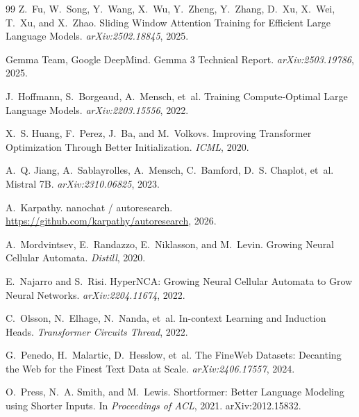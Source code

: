 \documentclass[11pt,a4paper]{article}
\begin{document}
\begin{thebibliography}{99}
Z.~Fu, W.~Song, Y.~Wang, X.~Wu, Y.~Zheng, Y.~Zhang, D.~Xu, X.~Wei, T.~Xu, and X.~Zhao.
\newblock Sliding Window Attention Training for Efficient Large Language Models.
\newblock \emph{arXiv:2502.18845}, 2025.

Gemma Team, Google DeepMind.
\newblock Gemma 3 Technical Report.
\newblock \emph{arXiv:2503.19786}, 2025.

J.~Hoffmann, S.~Borgeaud, A.~Mensch, et~al.
\newblock Training Compute-Optimal Large Language Models.
\newblock \emph{arXiv:2203.15556}, 2022.

X.~S. Huang, F.~Perez, J.~Ba, and M.~Volkovs.
\newblock Improving Transformer Optimization Through Better Initialization.
\newblock \emph{ICML}, 2020.

A.~Q. Jiang, A.~Sablayrolles, A.~Mensch, C.~Bamford, D.~S. Chaplot, et~al.
\newblock Mistral 7B.
\newblock \emph{arXiv:2310.06825}, 2023.

A.~Karpathy.
\newblock nanochat / autoresearch.
\newblock \url{https://github.com/karpathy/autoresearch}, 2026.

A.~Mordvintsev, E.~Randazzo, E.~Niklasson, and M.~Levin.
\newblock Growing Neural Cellular Automata.
\newblock \emph{Distill}, 2020.

E.~Najarro and S.~Risi.
\newblock HyperNCA: Growing Neural Cellular Automata to Grow Neural Networks.
\newblock \emph{arXiv:2204.11674}, 2022.

C.~Olsson, N.~Elhage, N.~Nanda, et~al.
\newblock In-context Learning and Induction Heads.
\newblock \emph{Transformer Circuits Thread}, 2022.

G.~Penedo, H.~Malartic, D.~Hesslow, et~al.
\newblock The FineWeb Datasets: Decanting the Web for the Finest Text Data at Scale.
\newblock \emph{arXiv:2406.17557}, 2024.

O.~Press, N.~A. Smith, and M.~Lewis.
\newblock Shortformer: Better Language Modeling using Shorter Inputs.
\newblock In \emph{Proceedings of ACL}, 2021. arXiv:2012.15832.


\end{thebibliography}
\end{document}
